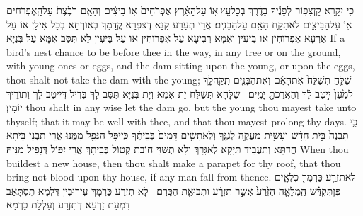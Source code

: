 {כִּ֣י יִקָּרֵ֣א קַן\maqqaf צִפּ֣וֹר \pasek  לְפָנֶ֡יךָ בַּדֶּ֜רֶךְ בְּכׇל\maqqaf עֵ֣ץ \legarmeh  א֣וֹ עַל\maqqaf הָאָ֗רֶץ אֶפְרֹחִים֙ א֣וֹ בֵיצִ֔ים וְהָאֵ֤ם רֹבֶ֙צֶת֙ עַל\maqqaf הָֽאֶפְרֹחִ֔ים א֖וֹ עַל\maqqaf הַבֵּיצִ֑ים לֹא\maqqaf תִקַּ֥ח הָאֵ֖ם עַל\maqqaf הַבָּנִֽים׃}
{אֲרֵי תְעָרַע קִנָּא דְּצִפְּרָא קֳדָמָךְ בְּאוֹרְחָא בְּכָל אִילָן אוֹ עַל אַרְעָא אֶפְרוֹחִין אוֹ בֵיעִין וְאִמָּא רְבִיעָא עַל אֶפְרוֹחִין אוֹ עַל בֵּיעִין לָא תִּסַּב אִמָּא עַל בְּנַיָּא׃}
{If a bird’s nest chance to be before thee in the way, in any tree or on the ground, with young ones or eggs, and the dam sitting upon the young, or upon the eggs, thou shalt not take the dam with the young;}{}
{שַׁלֵּ֤חַ תְּשַׁלַּח֙ אֶת\maqqaf הָאֵ֔ם וְאֶת\maqqaf הַבָּנִ֖ים תִּֽקַּֽח\maqqaf לָ֑ךְ לְמַ֙עַן֙ יִ֣יטַב לָ֔ךְ וְהַאֲרַכְתָּ֖ יָמִֽים׃ \setuma }
{שַׁלָּחָא תְּשַׁלַּח יָת אִמָּא וְיָת בְּנַיָּא תִּסַּב לָךְ בְּדִיל דְּיִיטַב לָךְ וְתוֹרֵיךְ יוֹמִין׃}
{thou shalt in any wise let the dam go, but the young thou mayest take unto thyself; that it may be well with thee, and that thou mayest prolong thy days.}{}
{כִּ֤י תִבְנֶה֙ בַּ֣יִת חָדָ֔שׁ וְעָשִׂ֥יתָ מַעֲקֶ֖ה לְגַגֶּ֑ךָ וְלֹֽא\maqqaf תָשִׂ֤ים דָּמִים֙ בְּבֵיתֶ֔ךָ כִּֽי\maqqaf יִפֹּ֥ל הַנֹּפֵ֖ל מִמֶּֽנּוּ׃}
{אֲרֵי תִבְנֵי בֵּיתָא חֲדַתָּא וְתַעֲבֵיד תְּיָקָא לְאִגָּרָךְ וְלָא תְשַׁוֵּי חוֹבַת קְטוֹל בְּבֵיתָךְ אֲרֵי יִפּוֹל דְּנָפֵיל מִנֵּיהּ׃}
{When thou buildest a new house, then thou shalt make a parapet for thy roof, that thou bring not blood upon thy house, if any man fall from thence.}{}
{לֹא\maqqaf תִזְרַ֥ע כַּרְמְךָ֖ כִּלְאָ֑יִם פֶּן\maqqaf תִּקְדַּ֗שׁ הַֽמְלֵאָ֤ה הַזֶּ֙רַע֙ אֲשֶׁ֣ר תִּזְרָ֔ע וּתְבוּאַ֖ת הַכָּֽרֶם׃ \setuma }
{לָא תִזְרַע כַּרְמָךְ עֵירוּבִין דִּלְמָא תִסְתָּאַב דִּמְעַת זַרְעָא דְּתִזְרַע וְעַלְלַת כַּרְמָא׃}
